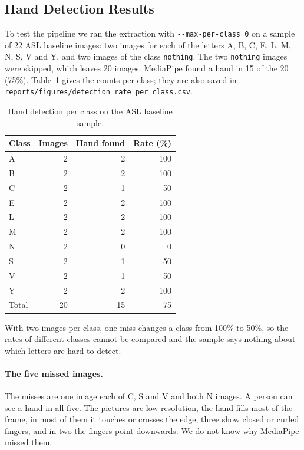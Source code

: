 \subsection{Hand Detection Results}
\label{sec:feature-results}

To test the pipeline we ran the extraction with \texttt{-{}-max-per-class 0} on a sample of 22 ASL baseline images: two images for each of the letters A, B, C, E, L, M, N, S, V and Y, and two images of the class \texttt{nothing}. The two \texttt{nothing} images were skipped, which leaves 20 images. MediaPipe found a hand in 15 of the 20 (75\%). Table~\ref{tab:detection} gives the counts per class; they are also saved in \texttt{reports/figures/detection\_rate\_per\_class.csv}.

\begin{table}[htbp]
\centering
\caption{Hand detection per class on the ASL baseline sample.}
\label{tab:detection}
\begin{tabular}{lrrr}
\hline
Class & Images & Hand found & Rate (\%) \\
\hline
A & 2 & 2 & 100 \\
B & 2 & 2 & 100 \\
C & 2 & 1 & 50 \\
E & 2 & 2 & 100 \\
L & 2 & 2 & 100 \\
M & 2 & 2 & 100 \\
N & 2 & 0 & 0 \\
S & 2 & 1 & 50 \\
V & 2 & 1 & 50 \\
Y & 2 & 2 & 100 \\
\hline
Total & 20 & 15 & 75 \\
\hline
\end{tabular}
\end{table}


With two images per class, one miss changes a class from 100\% to 50\%, so the rates of different classes cannot be compared and the sample says nothing about which letters are hard to detect.

\paragraph{The five missed images.} The misses are one image each of C, S and V and both N images. A person can see a hand in all five. The pictures are low resolution, the hand fills most of the frame, in most of them it touches or crosses the edge, three show closed or curled fingers, and in two the fingers point downwards. We do not know why MediaPipe missed them.

